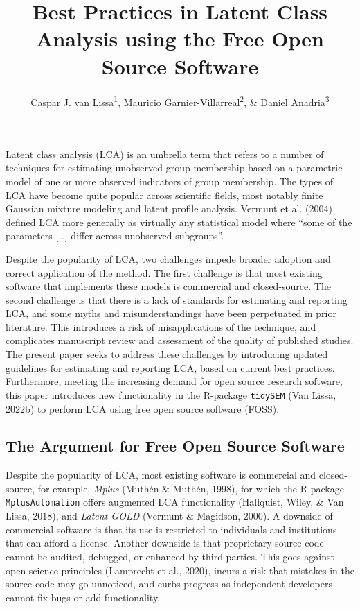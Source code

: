 \documentclass[
  ,man,floatsintext]{apa6}
\title{Best Practices in Latent Class Analysis using the Free Open Source Software}
\author{Caspar J. van Lissa\textsuperscript{1}, Mauricio Garnier-Villarreal\textsuperscript{2}, \& Daniel Anadria\textsuperscript{3}}
\date{}
\affiliation{\vspace{0.5cm}\textsuperscript{1} Tilburg University, Methodology \& Statistics\\\textsuperscript{2} Vrije Universiteit Amsterdam, Sociology\\\textsuperscript{3} Utrecht University, Methodology \& Statistics}
\begin{document}
\maketitle

Latent class analysis (LCA) is an umbrella term that refers to a number
of techniques for estimating unobserved group membership based on a
parametric model of one or more observed indicators of group membership.
The types of LCA have become quite popular across scientific fields,
most notably finite Gaussian mixture modeling and latent profile
analysis. Vermunt et al. (2004) defined LCA more generally as
virtually any statistical model where ``some of the parameters {[}\ldots{]}
differ across unobserved subgroups''.

Despite the popularity of LCA,
two challenges impede broader adoption and correct application of the method.
The first challenge is that most existing software that implements these models is commercial and closed-source.
The second challenge is that there is a lack of standards for estimating and reporting LCA, and some myths and misunderstandings have been perpetuated in prior literature.
This introduces a risk of misapplications of the technique,
and complicates manuscript review and assessment of the quality of published studies.
The present paper seeks to address these challenges by introducing updated guidelines for estimating and reporting LCA,
based on current best practices.
Furthermore, meeting the increasing demand for open source research software,
this paper introduces new functionality in the R-package \texttt{tidySEM} (Van Lissa, 2022b) to perform LCA using free open source software (FOSS).

\hypertarget{the-argument-for-free-open-source-software}{%
\subsection{The Argument for Free Open Source Software}\label{the-argument-for-free-open-source-software}}

Despite the popularity of LCA,
most existing software is commercial and closed-source,
for example, \emph{Mplus} (Muthén \& Muthén, 1998), for which the R-package \texttt{MplusAutomation} offers augmented LCA functionality (Hallquist, Wiley, \& Van Lissa, 2018), and \emph{Latent GOLD} (Vermunt \& Magidson, 2000).
A downside of commercial software is that its use is restricted to individuals and institutions that can afford a license.
Another downside is that proprietary source code cannot be audited, debugged, or enhanced by third parties.
This goes against open science principles (Lamprecht et al., 2020),
incurs a risk that mistakes in the source code may go unnoticed,
and curbs progress as independent developers cannot fix bugs or add functionality.
\end{document}

